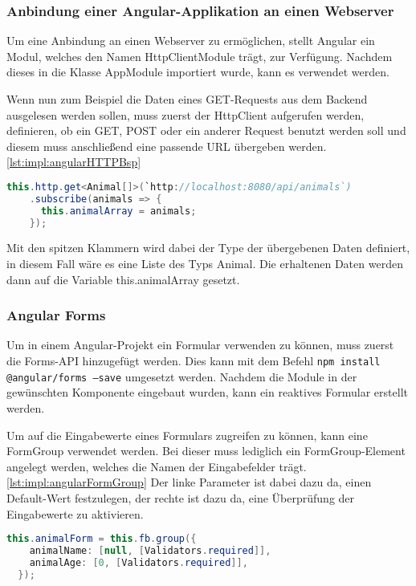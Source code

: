 \subsubsection{Anbindung einer Angular-Applikation an einen Webserver}
Um eine Anbindung an einen Webserver zu ermöglichen, stellt Angular ein Modul, welches den Namen HttpClientModule trägt, zur Verfügung. Nachdem dieses in die Klasse AppModule importiert wurde, kann es verwendet werden.
 
Wenn nun zum Beispiel die Daten eines GET-Requests aus dem Backend ausgelesen werden sollen, muss zuerst der HttpClient aufgerufen werden, definieren, ob ein GET, POST oder ein anderer Request benutzt werden soll und diesem muss anschließend eine passende URL übergeben werden. \ref{lst:impl:angularHTTPBsp}
 
\begin{lstlisting}[language=java,caption=Beispiel für einen GET-Request,label=lst:impl:angularHTTPBsp]
  this.http.get<Animal[]>(`http://localhost:8080/api/animals`)
    .subscribe(animals => {
      this.animalArray = animals;
    });
\end{lstlisting}
 
Mit den spitzen Klammern wird dabei der Type der übergebenen Daten definiert, in diesem Fall wäre es eine Liste des Typs Animal. Die erhaltenen Daten werden dann auf die Variable this.animalArray gesetzt.
 
\subsubsection{Angular Forms}
Um in einem Angular-Projekt ein Formular verwenden zu können, muss zuerst die Forms-API hinzugefügt werden. Dies kann mit dem Befehl \texttt{npm install @angular/forms --save} umgesetzt werden. Nachdem die Module in der gewünschten Komponente eingebaut wurden, kann ein reaktives Formular erstellt werden.
 
Um auf die Eingabewerte eines Formulars zugreifen zu können, kann eine FormGroup verwendet werden. Bei dieser muss lediglich ein FormGroup-Element angelegt werden, welches die Namen der Eingabefelder trägt. \ref{lst:impl:angularFormGroup} Der linke Parameter ist dabei dazu da, einen Default-Wert festzulegen, der rechte ist dazu da, eine Überprüfung der Eingabewerte zu aktivieren.
 
\begin{lstlisting}[language=java,caption=Beispiel für FormGroup eines Angular Formulars,label=lst:impl:angularFormGroup]
  this.animalForm = this.fb.group({
    animalName: [null, [Validators.required]],
    animalAge: [0, [Validators.required]],
  });
\end{lstlisting}
 
